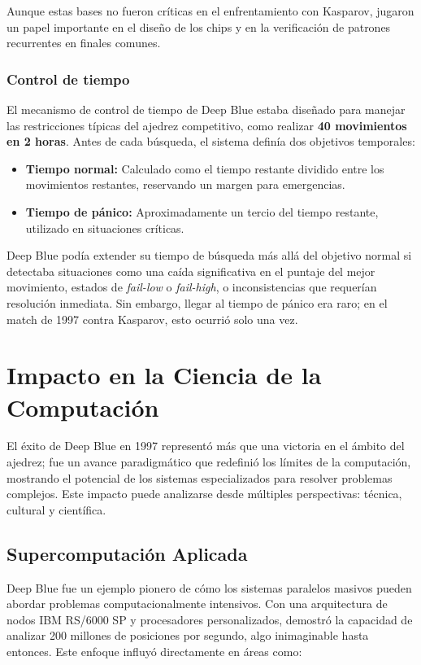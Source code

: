 \documentclass[12pt,a4paper]{article}
\begin{document}
Aunque estas bases no fueron críticas en el enfrentamiento con Kasparov, jugaron un papel importante en el diseño de los chips y en la verificación de patrones recurrentes en finales comunes.

\subsubsection*{Control de tiempo}
El mecanismo de control de tiempo de Deep Blue estaba diseñado para manejar las restricciones típicas del ajedrez competitivo, como realizar \textbf{40 movimientos en 2 horas}. Antes de cada búsqueda, el sistema definía dos objetivos temporales:
\begin{itemize}
    \item \textbf{Tiempo normal:} Calculado como el tiempo restante dividido entre los movimientos restantes, reservando un margen para emergencias.
    \item \textbf{Tiempo de pánico:} Aproximadamente un tercio del tiempo restante, utilizado en situaciones críticas.
\end{itemize}
Deep Blue podía extender su tiempo de búsqueda más allá del objetivo normal si detectaba situaciones como una caída significativa en el puntaje del mejor movimiento, estados de \textit{fail-low} o \textit{fail-high}, o inconsistencias que requerían resolución inmediata. Sin embargo, llegar al tiempo de pánico era raro; en el match de 1997 contra Kasparov, esto ocurrió solo una vez.
\newpage

\section{Impacto en la Ciencia de la Computación}

El éxito de Deep Blue en 1997 representó más que una victoria en el ámbito del ajedrez; fue un avance paradigmático que redefinió los límites de la computación, mostrando el potencial de los sistemas especializados para resolver problemas complejos. Este impacto puede analizarse desde múltiples perspectivas: técnica, cultural y científica.

\subsection{Supercomputación Aplicada}

Deep Blue fue un ejemplo pionero de cómo los sistemas paralelos masivos pueden abordar problemas computacionalmente intensivos. Con una arquitectura de nodos IBM RS/6000 SP y procesadores personalizados, demostró la capacidad de analizar 200 millones de posiciones por segundo, algo inimaginable hasta entonces. Este enfoque influyó directamente en áreas como:
\end{document}
